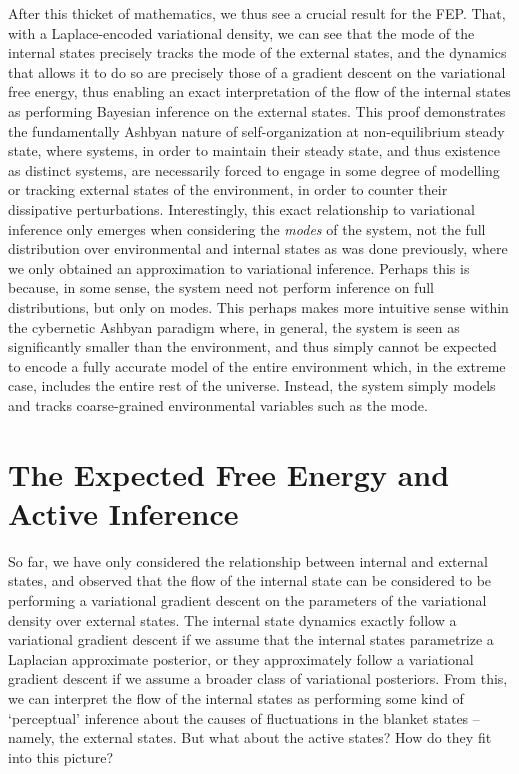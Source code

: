 After this thicket of mathematics, we thus see a crucial result for the FEP. That, with a Laplace-encoded variational density, we can see that the mode of the internal states precisely tracks the mode of the external states, and the dynamics that allows it to do so are precisely those of a gradient descent on the variational free energy, thus enabling an exact interpretation of the flow of the internal states as performing Bayesian inference on the external states. This proof demonstrates the fundamentally Ashbyan nature of self-organization at non-equilibrium steady state, where systems, in order to maintain their steady state, and thus existence as distinct systems, are necessarily forced to engage in some degree of modelling or tracking external states of the environment, in order to counter their dissipative perturbations. Interestingly, this exact relationship to variational inference only emerges when considering the \emph{modes} of the system, not the full distribution over environmental and internal states as was done previously, where we only obtained an approximation to variational inference. Perhaps this is because, in some sense, the system need not perform inference on full distributions, but only on modes. This perhaps makes more intuitive sense within the cybernetic Ashbyan paradigm where, in general, the system is seen as significantly smaller than the environment, and thus simply cannot be expected to encode a fully accurate model of the entire environment which, in the extreme case, includes the entire rest of the universe. Instead, the system simply models and tracks coarse-grained environmental variables such as the mode.

\section{The Expected Free Energy and Active Inference}
So far, we have only considered the relationship between internal and external states, and observed that the flow of the internal state can be considered to be performing a variational gradient descent on the parameters of the variational density over external states. The internal state dynamics exactly follow a variational gradient descent if we assume that the internal states parametrize a Laplacian approximate posterior, or they approximately follow a variational gradient descent if we assume a broader class of variational posteriors. From this, we can interpret the flow of the internal states as performing some kind of `perceptual' inference about the causes of fluctuations in the blanket states -- namely, the external states. But what about the active states? How do they fit into this picture? 

